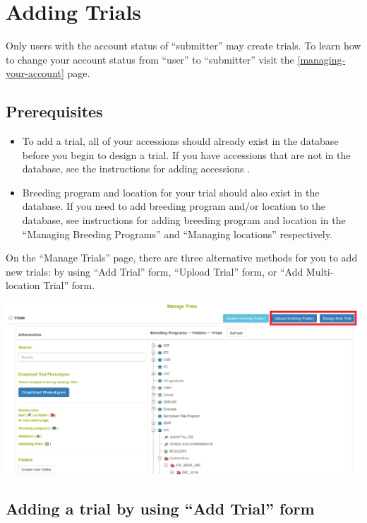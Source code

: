 \documentclass[
  12pt,
]{book}
\begin{document}
\hypertarget{adding-trials}{%
\section{Adding Trials}\label{adding-trials}}

Only users with the account status of ``submitter'' may create trials. To learn how to change your account status from ``user'' to ``submitter'' visit the \ref{managing-your-account} page.

\hypertarget{prerequisites}{%
\subsection{Prerequisites}\label{prerequisites}}

\begin{itemize}
\item
  To add a trial, all of your accessions should already exist in the database before you begin to design a trial. If you have accessions that are not in the database, see the instructions for adding accessions .
\item
  Breeding program and location for your trial should also exist in the database. If you need to add breeding program and/or location to the database, see instructions for adding breeding program and location in the ``Managing Breeding Programs'' and ``Managing locations'' respectively.
\end{itemize}

On the ``Manage Trials'' page, there are three alternative methods for you to add new trials: by using ``Add Trial'' form, ``Upload Trial'' form, or ``Add Multi-location Trial'' form.

\begin{center}\includegraphics[width=0.95\linewidth]{assets/images/trial_create_manage_trials} \end{center}

\hypertarget{adding-a-trial-by-using-add-trial-form}{%
\subsection{Adding a trial by using ``Add Trial'' form}\label{adding-a-trial-by-using-add-trial-form}}
\end{document}
